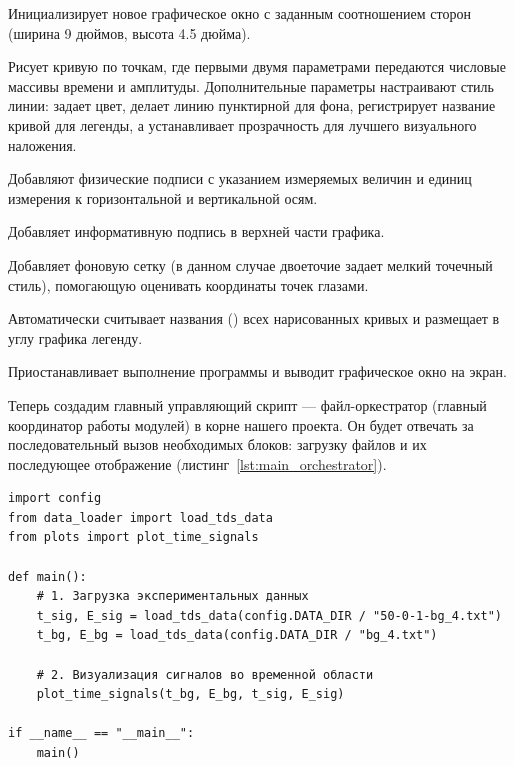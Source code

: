 \begin{syntaxdesc}
    \item[Создание окна рисунка \mycode{plt.figure(figsize=(9, 4.5))} (строка 7)] Инициализирует новое графическое окно с заданным соотношением сторон (ширина 9 дюймов, высота 4.5 дюйма).
    \item[Построение графика \mycode{plt.plot(...)} (строки 10--24)] Рисует кривую по точкам, где первыми двумя параметрами передаются числовые массивы времени и амплитуды. Дополнительные параметры настраивают стиль линии:  задает цвет,  делает линию пунктирной для фона,  регистрирует название кривой для легенды, а  устанавливает прозрачность для лучшего визуального наложения.
    \item[Подписи осей \mycode{plt.xlabel(...)} и \mycode{plt.ylabel(...)} (строки 26--27)] Добавляют физические подписи с указанием измеряемых величин и единиц измерения к горизонтальной и вертикальной осям.
    \item[Заголовок рисунка \mycode{plt.title(...)} (строка 28)] Добавляет информативную подпись в верхней части графика.
    \item[Сетка графика \mycode{plt.grid(True, ...)} (строка 29)] Добавляет фоновую сетку (в данном случае двоеточие \mycode{:} задает мелкий точечный стиль), помогающую оценивать координаты точек глазами.
    \item[Отображение легенды \mycode{plt.legend()} (строка 30)] Автоматически считывает названия () всех нарисованных кривых и размещает в углу графика легенду.
    \item[Вывод на экран \mycode{plt.show()} (строка 31)] Приостанавливает выполнение программы и выводит графическое окно на экран.
\end{syntaxdesc}

Теперь создадим главный управляющий скрипт --- файл-оркестратор (главный координатор работы модулей)  в корне нашего проекта. Он будет отвечать за последовательный вызов необходимых блоков: загрузку файлов и их последующее отображение (листинг~\ref{lst:main_orchestrator}).

\begin{listing}[H]
	\caption{Главный управляющий файл ()}\label{lst:main_orchestrator}
	\begin{verbatim}
import config
from data_loader import load_tds_data
from plots import plot_time_signals

def main():
    # 1. Загрузка экспериментальных данных
    t_sig, E_sig = load_tds_data(config.DATA_DIR / "50-0-1-bg_4.txt")
    t_bg, E_bg = load_tds_data(config.DATA_DIR / "bg_4.txt")

    # 2. Визуализация сигналов во временной области
    plot_time_signals(t_bg, E_bg, t_sig, E_sig)

if __name__ == "__main__":
    main()
	\end{verbatim}
\end{listing}

